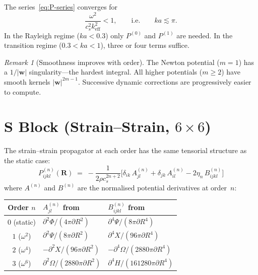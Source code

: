 \documentclass[11pt,a4paper]{article}
\newcommand{\bR}{\bm{R}}
\newcommand{\bw}{\bm{w}}
\theoremstyle{plain}
\theoremstyle{remark}
\newtheorem{remark}[theorem]{Remark}
\begin{document}
The series~\eqref{eq:P-series} converges for
\begin{equation}
  \frac{\omega^2}{c_s^2 k_{\mathrm{eff}}^2} < 1,
  \qquad\text{i.e.}\qquad
  ka \lesssim \pi.
\end{equation}
In the Rayleigh regime ($ka < 0.3$) only $P^{(0)}$ and $P^{(1)}$ are
needed.  In the transition regime ($0.3 < ka < 1$), three or four
terms suffice.

\begin{remark}[Smoothness improves with order]
The Newton potential ($m=1$) has a $1/|\bw|$ singularity---the
hardest integral.  All higher potentials ($m\geq 2$) have smooth
kernels $|\bw|^{2m-1}$.  Successive dynamic corrections are
progressively easier to compute.
\end{remark}


\section{S Block (Strain--Strain, $6\times 6$)}
\label{sec:S-block}

The strain--strain propagator at each order has the same tensorial
structure as the static case:
\begin{equation}
  \boxed{
  P^{(n)}_{ijkl}(\bR) \;=\;
  -\frac{1}{2\rho c_s^{2n+2}}\bigl[
    \delta_{ik}\,A^{(n)}_{jl}
  + \delta_{jk}\,A^{(n)}_{il}
  - 2\eta_n\,B^{(n)}_{ijkl}
  \bigr]
  }
  \label{eq:Pn-assembly}
\end{equation}
where $A^{(n)}$ and $B^{(n)}$ are the normalised potential
derivatives at order~$n$:
\begin{center}
\begin{tabular}{cll}
\toprule
Order $n$ & $A^{(n)}_{jl}$ from & $B^{(n)}_{ijkl}$ from \\
\midrule
$0$ (static) & $\partial^2\Phi/(4\pi\partial R^2)$ & $\partial^4\Psi/(8\pi\partial R^4)$ \\
$1$ ($\omega^2$) & $\partial^2\Psi/(8\pi\partial R^2)$ & $\partial^4 X/(96\pi\partial R^4)$ \\
$2$ ($\omega^4$) & $-\partial^2 X/(96\pi\partial R^2)$ & $-\partial^4\Omega/(2880\pi\partial R^4)$ \\
$3$ ($\omega^6$) & $\partial^2\Omega/(2880\pi\partial R^2)$ & $\partial^4 H/(161280\pi\partial R^4)$ \\
\bottomrule
\end{tabular}
\end{center}
\end{document}

